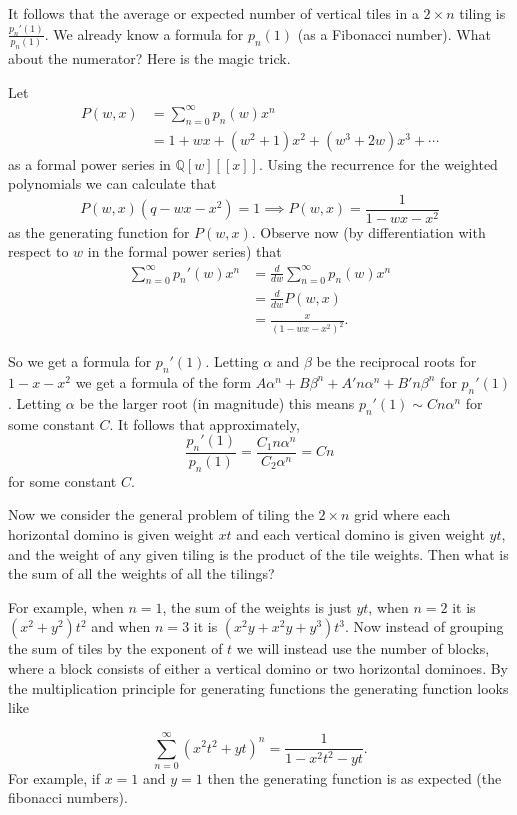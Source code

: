 It follows that the average or expected number of vertical tiles in a $2 \times n$ tiling is $\frac{p_n'(1)}{p_n(1)}$. We already know a formula for $p_n(1)$ (as a Fibonacci number). What about the numerator? Here is the magic trick.

Let 
\begin{align*}
P(w, x) &= \sum_{n = 0}^{\infty}p_n(w)x^n \\
&= 1 + wx + (w^2 + 1)x^2 + (w^3 + 2w)x^3 + \cdots
\end{align*}
as a formal power series in $\mathbb{Q}[w][[x]]$. Using the recurrence for the weighted polynomials we can calculate that
\[P(w, x)(q - wx - x^2) = 1 \implies P(w, x) = \frac{1}{1-wx - x^2}\] as the generating function for $P(w, x)$. Observe now (by differentiation with respect to $w$ in the formal power series) that
\begin{align*}
\sum_{n = 0}^{\infty}p_n'(w)x^n &= \frac{d}{dw}\sum_{n = 0}^{\infty}p_n(w)x^n \\
&= \frac{d}{dw}P(w, x) \\
&= \frac{x}{(1 - wx - x^2)^2}.
\end{align*}

So we get a formula for $p_n'(1)$. Letting $\alpha$ and $\beta$ be the reciprocal roots for $1 - x - x^2$ we get a formula of the form $A\alpha^n + B\beta^n + A'n\alpha^n + B'n\beta^n$ for $p_n'(1)$. Letting $\alpha$ be the larger root (in magnitude) this means $p_n'(1) \sim Cn\alpha^n$ for some constant $C$. It follows that approximately,
\[\frac{p_n'(1)}{p_n(1)} = \frac{C_1n\alpha^n}{C_2\alpha^n} = Cn\] for some constant $C$.

Now we consider the general problem of tiling the $2 \times n$ grid where each horizontal domino is given weight $xt$ and each vertical domino is given weight $yt$, and the weight of any given tiling is the product of the tile weights. Then what is the sum of all the weights of all the tilings?

For example, when $n = 1$, the sum of the weights is just $yt$, when $n = 2$ it is $(x^2 + y^2)t^2$ and when $n = 3$ it is $(x^2y + x^2y + y^3)t^3$. Now instead of grouping the sum of tiles by the exponent of $t$ we will instead use the number of blocks, where a block consists of either a vertical domino or two horizontal dominoes. By the multiplication principle for generating functions the generating function looks like

\[\sum_{n = 0}^{\infty}(x^2t^2 + yt)^n = \frac{1}{1 - x^2t^2 - yt}.\]
For example, if $x = 1$ and $y = 1$ then the generating function is as expected (the fibonacci numbers).